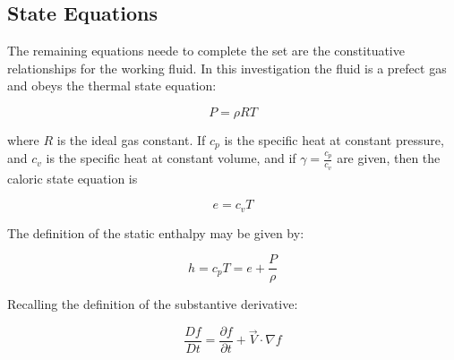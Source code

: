 \subsection{State Equations}

The remaining equations neede to complete the set are the constituative relationships for the working fluid. In this investigation the fluid is a prefect gas and obeys the thermal state equation:

\begin{equation}
  P = \rho R T
\end{equation}

where $R$ is the ideal gas constant. If $c_p$ is the specific heat at constant pressure, and $c_v$ is the specific heat at constant volume, and if $\gamma = \frac{c_p}{c_v}$ are given, then the caloric state equation is

\begin{equation}
  e = c_v T
\end{equation}

The definition of the static enthalpy may be given by:

\begin{equation}
  h = c_p T = e + \frac{P}{\rho}
\end{equation}

Recalling the definition of the substantive derivative:

\begin{equation}
  \frac{Df}{Dt} = \frac{\partial f}{\partial t} + \overrightarrow{V}\cdot\nabla f
\end{equation}
